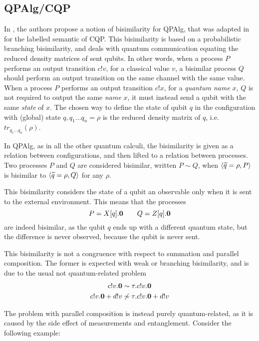 \subsection{QPAlg/CQP}\label{lalire_bisimulation}

In \cite{lalireRelationsQuantumProcesses2006}, the authors propose a notion of bisimilarity for QPAlg, that was adapted in \cite{davidsonFormalVerificationTechniques2012} for the labelled semantic of CQP. This bisimilarity is based on a probabilistic branching bisimilarity, and deals with quantum communication equating the reduced density matrices of sent qubits. In other words, when a process $P$ performs an output transition $c!v$, for a classical value $v$, a bisimilar process $Q$ should perform an output transition on the same channel with the same value. When a process $P$ performs an output transition $c!x$, for a \textit{quantum name} $x$, $Q$ is not required to output the same \textit{name} $x$, it must instead send a qubit with the same \textit{state} of $x$. The chosen way to define the state of qubit $q$ in the configuration with (global) state $q, q_1 \ldots q_n = \rho$ is the reduced density matrix of $q$, i.e. $tr_{q_1 \ldots q_n}(\rho)$.


In QPAlg, as in all the other quantum calculi, the bisimilarity is given as a relation between configurations, and then lifted to a relation between processes. Two processes $P$ and $Q$ are considered bisimilar, written $P \sim Q$, when $\langle\widetilde{q} = \rho, P\rangle$ is bisimilar to $\langle\widetilde{q} = \rho, Q\rangle$ for any $\rho$.

This bisimilarity considers the state of a qubit an observable only when it is sent to the external environment. This means that the processes 
\[ P = X[q].\mathbf{0} \qquad Q = Z[q].\mathbf{0}\]
are indeed bisimilar, as the qubit $q$ ends up with a different quantum state, but the difference is never observed, because the qubit is never sent.

This bisimilarity is not a congruence with respect to summation and parallel composition. The former is expected with weak or branching bisimilarity, and is due to the usual not quantum-related problem 
\begin{align*}
c!v.\mathbf{0} &\sim \tau.c!v.\mathbf{0} \\
c!v.\mathbf{0} + d!v &\not\sim \tau.c!v.\mathbf{0} + d!v
\end{align*}

The problem with parallel composition is instead purely quantum-related, as it is caused by the side effect of measurements and entanglement. Consider the following example:

